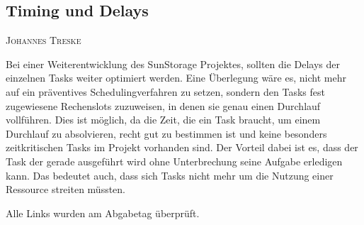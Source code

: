 \documentclass[12pt,a4paper,bibliography=totocnumbered,listof=totocnumbered]{article}
\makeatletter
\newcommand{\chapterauthor}[1]{%
  {\parindent0pt\vspace*{-5pt}%
  \linespread{1.1}\small\scshape#1%
  \par\nobreak\vspace*{3pt}}
  \@afterheading%
}
\makeatother
\begin{document}
\subsection{Timing und Delays}
\chapterauthor{Johannes Treske}
Bei einer Weiterentwicklung des SunStorage Projektes, sollten die Delays der einzelnen Tasks weiter optimiert werden.
Eine Überlegung wäre es, nicht mehr auf ein präventives Schedulingverfahren zu setzen, sondern den Tasks fest zugewiesene Rechenslots zuzuweisen, in denen sie genau einen Durchlauf vollführen.
Dies ist möglich, da die Zeit, die ein Task braucht, um einem Durchlauf zu absolvieren, recht gut zu bestimmen ist und keine besonders zeitkritischen Tasks im Projekt vorhanden sind.
Der Vorteil dabei ist es, dass der Task der gerade ausgeführt wird ohne Unterbrechung seine Aufgabe erledigen kann.
Das bedeutet auch, dass sich Tasks nicht mehr um die Nutzung einer Ressource streiten müssten.





\newpage
{}
\listoffigures

\newpage
\listoftables

\newpage
\printbibliography

Alle Links wurden am Abgabetag überprüft.
\end{document}
